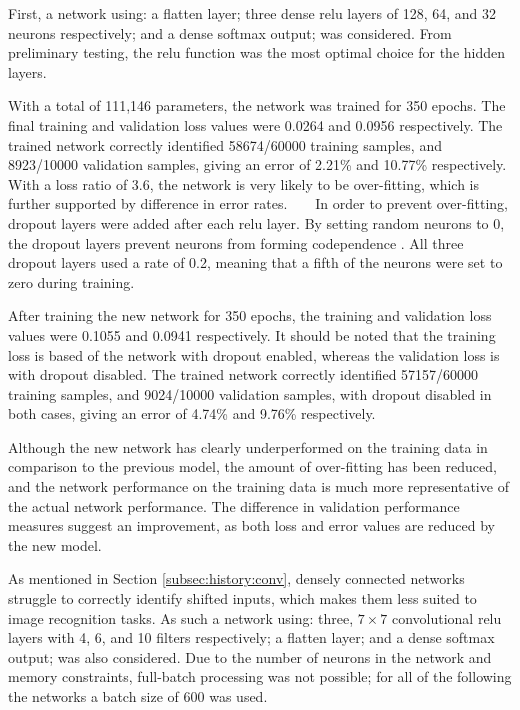 First, a network using: a flatten layer; three dense relu layers of 128, 64, and
32 neurons respectively; and a dense softmax output; was considered.
From preliminary testing, the relu function was the most optimal choice for the
hidden layers.

With a total of 111,146 parameters, the network was trained for 350 epochs.
The final training and validation loss values were 0.0264 and 0.0956
respectively.
The trained network correctly identified 58674/60000 training samples, and
8923/10000 validation samples, giving an error of 2.21\% and 10.77\%
respectively.
With a loss ratio of 3.6, the network is very likely to be over-fitting,
which is further supported by difference in error rates.
\newpage
~
\vfill
{}
\vfill
~
\newpage
In order to prevent over-fitting, dropout layers were added after each relu
layer.
By setting random neurons to 0, the dropout layers prevent neurons from forming
codependence \citep{Hinton:2012:Dropout}.
All three dropout layers used a rate of 0.2, meaning that a fifth of the neurons
were set to zero during training.

After training the new network for 350 epochs, the training and validation loss
values were 0.1055 and 0.0941 respectively.
It should be noted that the training loss is based of the network with dropout
enabled, whereas the validation loss is with dropout disabled.
The trained network correctly identified 57157/60000 training samples, and
9024/10000 validation samples, with dropout disabled in both cases, giving an
error of 4.74\% and 9.76\% respectively.

Although the new network has clearly underperformed on the training data in
comparison to the previous model, the amount of over-fitting has been reduced,
and the network performance on the training data is much more representative of
the actual network performance.
The difference in validation performance measures suggest an improvement, as
both loss and error values are reduced by the new model.

As mentioned in Section \ref{subsec:history:conv}, densely connected networks
struggle to correctly identify shifted inputs, which makes them less suited to
image recognition tasks.
As such a network using: three, $7\times7$ convolutional relu layers with 4, 6,
and 10 filters respectively; a flatten layer; and a dense softmax output; was
also considered.
Due to the number of neurons in the network and memory constraints, full-batch
processing was not possible; for all of the following the networks a batch size
of 600 was used.


